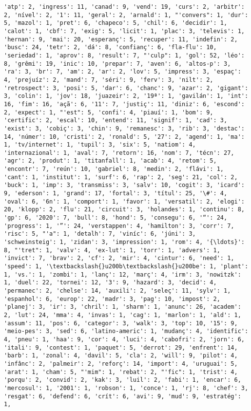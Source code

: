 \documentclass[11pt]{article}
\begin{document}
\begin{Verbatim}[commandchars=\\\{\}]
'atp': 2, 'ingress': 11, 'canad': 9, 'vend': 19, 'curs': 2, 'arbitr': 2, 'nível': 2, '1': 11, 'geral': 2, 'arnald': 1, "'convers": 1, 'dur': 5, 'mazol': 1, 'pret': 6, 'chapeco': 5, 'chil': 6, 'decidir': 1, 'calot': 1, 'cbf': 7, 'exig': 5, 'licit': 1, 'plac': 3, 'televis': 1, 'hernan': 9, 'mai': 20, 'esperanç': 5, 'recuper': 11, 'indefin': 2, 'busc': 24, 'tetr': 2, 'dá': 8, 'confianç': 6, 'fla-flu': 10, 'seriedad': 1, 'aprov': 8, 'result': 7, "'culp": 1, 'gol': 52, 'léo': 8, 'grêmi': 19, 'inic': 10, 'prepar': 7, 'aven': 6, 'altos-p': 3, 'ra': 3, 'br': 7, 'am': 2, 'ar': 2, 'lov': 5, 'impress': 3, 'espaç': 4, 'prejuíz': 2, 'mand': 7, 'séri': 9, 'ferv': 3, 'nilt': 2, 'retrospect': 3, 'posi': 5, 'dar': 6, 'chanc': 9, 'azar': 2, 'gigant': 3, 'colin': 1, 'jov': 18, 'juazeir': 2, '19ª': 1, 'gavilán': 1, 'int': 16, 'fim': 16, 'açã': 6, '11': 7, 'justiç': 11, 'diniz': 6, 'escond': 2, 'expect': 1, "'est": 5, 'confi': 4, 'piauí': 1, 'bom': 9, 'certific': 2, 'escal': 10, 'entend': 11, 'signif': 1, 'cad': 3, 'exist': 3, 'cobiç': 3, 'chin': 9, 'remanesc': 3, 'rib': 3, 'destac': 14, 'númer': 10, 'cristi': 2, 'ronald': 5, '27': 2, 'agend': 1, 'ma': 1, 'tv/internet': 1, 'tupil': 3, 'six': 5, 'natiom': 4, 'internazional': 1, 'aval': 7, 'retorn': 16, 'nom': 7, 'técn': 27, 'agr': 2, 'produt': 1, 'titanfall': 1, 'acab': 4, 'retom': 5, 'encontr': 7, 'reún': 10, 'gabriel': 8, 'medin': 2, 'flávi': 1, 'cant': 1, 'institut': 1, 'surf': 6, 'rap': 2, 'seg': 21, 'col': 2, 'buck': 1, 'imp': 3, 'transmiss': 3, 'salv': 10, 'cogit': 3, 'icard': 9, 'ederson': 1, 'grand': 17, 'fortal': 3, 'títul': 25, '\#': 4, 'oval': 6, '6n': 1, 'comport': 1, 'favor': 1, 'versatil': 2, 'elogi': 20, 'klopp': 2, 'flu': 21, 'circuit': 3, 'holandes': 1, 'continu': 8, 'gp': 6, '2020': 7, 'bull': 8, 'hond': 5, 'consegu': 6, '“': 24, 'progress': 1, '”': 24, 'verstappen': 4, 'hamilton': 3, 'corr': 7, 'risc': 5, "'a": 1, 'detalh': 7, 'viníc': 6, 'júni': 3, 'schweinsteig': 1, 'zidan': 3, 'impression': 1, 'rom': 4, '{\ldots}': 8, "'tret": 1, 'valv': 4, 'ex-lut': 1, 'torr': 1, 'advers': 1, 'invict': 7, 'brav': 2, 'cf': 2, 'mir': 4, 'cintur': 6, 'need': 1, 'speed': 1, '\textbackslash{}u200b\textbackslash{}u200be': 1, 'plant': 1, 'vs.': 1, 'zombi': 1, 'lanç': 12, 'març': 4, 'irm': 3, 'nowitzk': 1, 'duel': 22, 'tornei': 12, '3': 9, 'hazard': 3, 'decid': 4, 'permanec': 2, 'chelse': 14, 'auxili': 2, 'seleç': 11, 'sylv': 1, 'espanhol': 6, 'europ': 22, 'madr': 3, 'pag': 10, 'impost': 2, 'planej': 3, 'ir': 3, 'chril': 1, 'sharm': 1, 'anunc': 26, 'academ': 2, 'lut': 24, 'mma': 4, 'invas': 1, 'cag': 1, 'marlon': 1, 'ald': 1, 'assum': 11, 'pos': 6, 'categor': 3, 'walk': 3, 'top': 10, '15': 9, 'meio-pes': 3, 'sed': 6, 'latino-americ': 1, 'mudanç': 4, 'identific': 4, 'pneu': 1, 'haa': 9, 'cor': 4, 'luci': 4, 'cabofri': 2, 'jorn': 6, 'itali': 9, 'contest': 1, 'paquet': 5, 'derrot': 29, 'enfrent': 14, 'barb': 1, 'zonal': 4, 'davil': 5, 'cla': 2, 'will': 9, 'pilot': 4, 'infânc': 2, 'palmeir': 2, 'reforç': 14, 'import': 4, 'uruguai': 5, 'arat': 1, 'cham': 5, "'mim": 1, 'rebat': 2, "'fic": 1, 'trist': 4, 'porqu': 2, 'convid': 2, 'kak': 3, 'luil': 2, 'fabi': 1, 'encar': 6, 'mercosul': 1, '2001': 1, 'robson': 1, 'conce': 1, 'rj': 8, 'chef': 3, 'resgat': 6, 'defend': 6, 'crít': 6, 'avi': 9, 'mud': 9, 'estratég': 1, 
\end{Verbatim}
\end{document}
